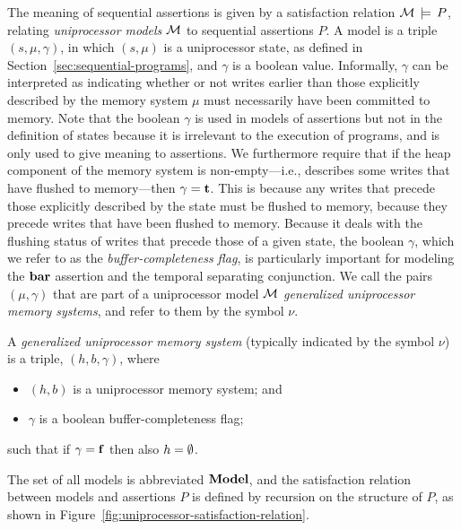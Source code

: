 \documentclass[11pt]{report}         %
\begin{document}
The meaning of sequential assertions is given by a satisfaction relation $\mathcal{M} \,\models\, P$, relating \emph{uniprocessor models} $\mathcal{M}$ to sequential assertions $P$. A model is a triple $(s,\mu,\gamma)$, in which $(s,\mu)$ is a uniprocessor state, as defined in Section~\ref{sec:sequential-programs}, and $\gamma$ is a boolean value. Informally, $\gamma$ can be interpreted as indicating whether or not writes earlier than those explicitly described by the memory system $\mu$ must necessarily have been committed to memory. Note that the boolean $\gamma$ is used in models of assertions but not in the definition of states because it is irrelevant to the execution of programs, and is only used to give meaning to assertions. We furthermore require that if the heap component of the memory system is non-empty---i.e., describes some writes that have flushed to memory---then $\gamma = \mathbf{t}$. This is because any writes that precede those explicitly described by the state must be flushed to memory, because they precede writes that have been flushed to memory. Because it deals with the flushing status of writes that precede those of a given state, the boolean $\gamma$, which we refer to as the \emph{buffer-completeness flag}, is particularly important for modeling the $\mathbf{bar}$ assertion and the temporal separating conjunction. We call the pairs $(\mu,\gamma)$ that are part of a uniprocessor model $\mathcal{M}$ \emph{generalized uniprocessor memory systems}, and refer to them by the symbol $\nu$.

\begin{definition}
  A \emph{generalized uniprocessor memory system} (typically indicated by the symbol $\nu$) is a triple, $(h, b, \gamma)$, where \begin{itemize}
    \item $(h,b)$ is a uniprocessor memory system; and
    \item $\gamma$ is a boolean buffer-completeness flag; 
  \end{itemize} such that if $\gamma = \mathbf{f}$ then also $h = \operatorname{\emptyset}$. 
\end{definition} 

The set of all models is abbreviated $\mathbf{Model}$, and the satisfaction relation between models and assertions $P$ is defined by recursion on the structure of $P$, as shown in Figure~\ref{fig:uniprocessor-satisfaction-relation}. 
\end{document}

